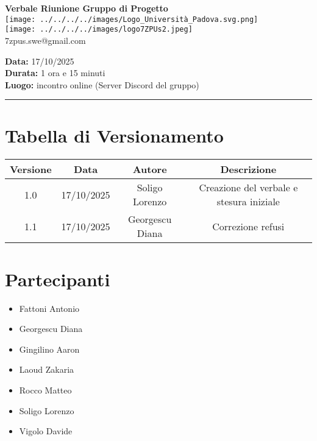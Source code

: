 \documentclass[a4paper,12pt]{article}
\begin{document}
\begin{center}
    \Large \textbf{Verbale Riunione Gruppo di Progetto}\\
    \vspace{0.5cm}
    \texttt{[image: ../../../../images/Logo\_Università\_Padova.svg.png]}\\
    \texttt{[image: ../../../../images/logo7ZPUs2.jpeg]}\\
    \small\hspace{10cm} 7zpus.swe@gmail.com
\end{center}

\noindent
\textbf{Data:} 17/10/2025 \\
\textbf{Durata:} 1 ora e 15 minuti \\
\textbf{Luogo:} incontro online (Server Discord del gruppo)

\vspace{0.3cm}
\hrule
\vspace{0.5cm}

\tableofcontents

\newpage

\section{Tabella di Versionamento}
    \begin{tabular}{|c|c|c|c|}
        \hline
        \textbf{Versione} & \textbf{Data} & \textbf{Autore} & \textbf{Descrizione} \\
        \hline
        1.0 & 17/10/2025 & Soligo Lorenzo & Creazione del verbale e stesura iniziale \\
        \hline
        1.1 & 17/10/2025 & Georgescu Diana & Correzione refusi \\
        \hline
    \end{tabular}


\section{Partecipanti}
\begin{itemize}[noitemsep]
    \item Fattoni Antonio 
    \item Georgescu Diana
    \item Gingilino Aaron
    \item Laoud Zakaria
    \item Rocco Matteo
    \item Soligo Lorenzo
    \item Vigolo Davide
\end{itemize}
\end{document}

